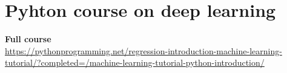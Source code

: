 \documentclass[11pt]{article}
\begin{document}
\clearpage
\section{Pyhton course on deep learning}
\textbf{Full course}\\
\url{https://pythonprogramming.net/regression-introduction-machine-learning-tutorial/?completed=/machine-learning-tutorial-python-introduction/}
\end{document}
